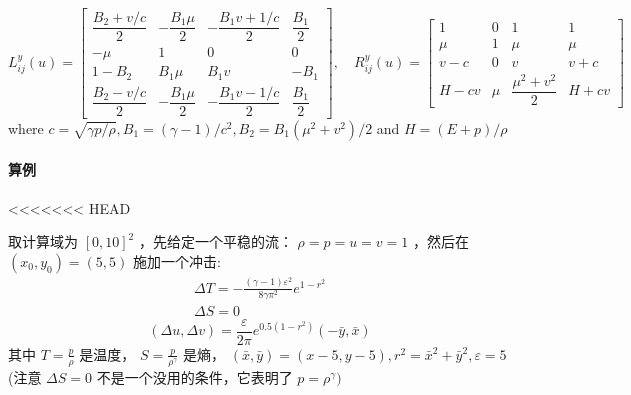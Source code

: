 \documentclass{book}
\begin{document}
\begin{example}
\begin{example}{}{}
\begin{example}
\begin{example}
\begin{example}
\begin{example}
\begin{example}{}{}
\begin{equation}
    L_{i j}^{y}(u)=\begin{bmatrix}
        \dfrac{B_{2}+v / c}{2} & -\dfrac{B_{1} \mu}{2} & -\dfrac{B_{1} v+1 / c}{2} & \dfrac{B_{1}}{2} \\
        -\mu                   & 1                     & 0                         & 0                \\
        1-B_{2}                & B_{1} \mu             & B_{1} v                   & -B_{1}           \\
        \dfrac{B_{2}-v / c}{2} & -\dfrac{B_{1} \mu}{2} & -\dfrac{B_{1} v-1 / c}{2} & \dfrac{B_{1}}{2}
    \end{bmatrix},\quad
    R_{i j}^{y}(u)=\begin{bmatrix}
        1     & 0   & 1                        & 1     \\
        \mu   & 1   & \mu                      & \mu   \\
        v-c   & 0   & v                        & v+c   \\
        H-c v & \mu & \dfrac{\mu^{2}+v^{2}}{2} & H+c v
    \end{bmatrix}
\end{equation}
where  $c=\sqrt{\gamma p / \rho}, B_{1}=(\gamma-1) / c^{2}, B_{2}=B_{1}\left(\mu^{2}+v^{2}\right) / 2$  and  $H=(E+p) / \rho$
\paragraph{算例}

<<<<<<< HEAD
\begin{example}[光滑算例]
    取计算域为  $[0,10]^{2}$  ，先给定一个平稳的流： $\rho=p=u=v=1$  ，然后在  $\left(x_{0}, y_{0}\right)=(5,5)$  施加一个冲击:
    \begin{equation}
        \begin{array}{l}
            \Delta T=-\frac{(\gamma-1) \varepsilon^{2}}{8 \gamma \pi^{2}} e^{1-r^{2}} \\
            \Delta S=0
        \end{array}
    \end{equation}
    \begin{equation}
        (\Delta u, \Delta v)=\frac{\varepsilon}{2 \pi} e^{0.5\left(1-r^{2}\right)}(-\bar{y}, \bar{x})
    \end{equation}
    其中  $T=\frac{p}{\rho}$  是温度，  $S=\frac{p}{\rho^{\gamma}}$  是熵，  $(\bar{x}, \bar{y})=(x-5, y-5) , r^{2}=\bar{x}^{2}+\bar{y}^{2}, \varepsilon=5 $
    (注意 $\Delta S=0$ 不是一个没用的条件，它表明了 $ p=\rho^{\gamma}  )$
\end{example}


\end{example}
\end{example}
\end{example}
\end{example}
\end{example}
\end{example}
\end{example}
\end{document}
